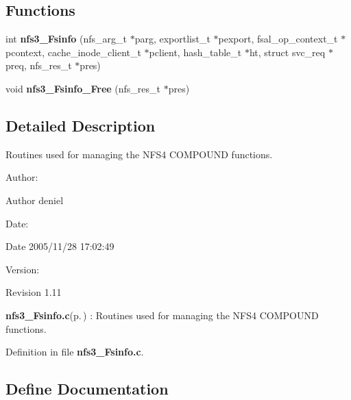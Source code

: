 \subsection*{Functions}
\begin{CompactItemize}
\item 
int {\bf nfs3\_\-Fsinfo} (nfs\_\-arg\_\-t $\ast$parg, exportlist\_\-t $\ast$pexport, fsal\_\-op\_\-context\_\-t $\ast$pcontext, cache\_\-inode\_\-client\_\-t $\ast$pclient, hash\_\-table\_\-t $\ast$ht, struct svc\_\-req $\ast$preq, nfs\_\-res\_\-t $\ast$pres)
\item 
void {\bf nfs3\_\-Fsinfo\_\-Free} (nfs\_\-res\_\-t $\ast$pres)
\end{CompactItemize}


\subsection{Detailed Description}
Routines used for managing the NFS4 COMPOUND functions. 

\begin{Desc}
\item[Author:]\begin{Desc}
\item[Author]deniel \end{Desc}
\end{Desc}
\begin{Desc}
\item[Date:]\begin{Desc}
\item[Date]2005/11/28 17:02:49 \end{Desc}
\end{Desc}
\begin{Desc}
\item[Version:]\begin{Desc}
\item[Revision]1.11 \end{Desc}
\end{Desc}
{\bf nfs3\_\-Fsinfo.c}{\rm (p.\,\pageref{nfs3__Fsinfo_8c})} : Routines used for managing the NFS4 COMPOUND functions.

Definition in file {\bf nfs3\_\-Fsinfo.c}.

\subsection{Define Documentation}
